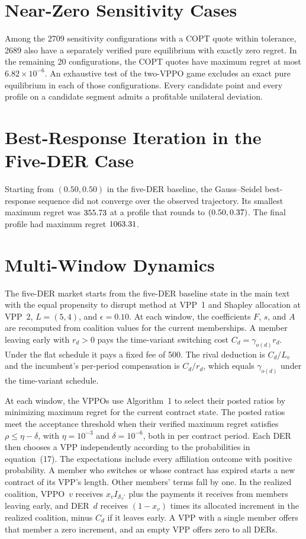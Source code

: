 \documentclass[10pt]{article}
\begin{document}
\section{Near-Zero Sensitivity Cases}\label{sec:nearzero}
Among the 2709 sensitivity configurations with a COPT quote within tolerance, 2689 also have a separately verified pure equilibrium with exactly zero regret. In the remaining 20 configurations, the COPT quotes have maximum regret at most $6.82\times10^{-6}$. An exhaustive test of the two-VPPO game excludes an exact pure equilibrium in each of those configurations. Every candidate point and every profile on a candidate segment admits a profitable unilateral deviation.

\section{Best-Response Iteration in the Five-DER Case}\label{sec:gs}
Starting from $(0.50,0.50)$ in the five-DER baseline, the Gauss--Seidel best-response sequence did not converge over the observed trajectory. Its smallest maximum regret was $355.73$ at a profile that rounds to $(0.50,0.37)$. The final profile had maximum regret $1063.31$.

\section{Multi-Window Dynamics}\label{sec:dynamics}
The five-DER market starts from the five-DER baseline state in the main text with the equal propensity to disrupt method at VPP~1 and Shapley allocation at VPP~2, $L=(5,4)$, and $\epsilon=0.10$. At each window, the coefficients $F$, $s$, and $A$ are recomputed from coalition values for the current memberships. A member leaving early with $r_d>0$ pays the time-variant switching cost $C_d=\gamma_{o(d)}r_d$. Under the flat schedule it pays a fixed fee of \CurrencySymbol{}500. The rival deduction is $C_d/L_v$ and the incumbent's per-period compensation is $C_d/r_d$, which equals $\gamma_{o(d)}$ under the time-variant schedule.

At each window, the VPPOs use Algorithm~1 to select their posted ratios by minimizing maximum regret for the current contract state. The posted ratios meet the acceptance threshold when their verified maximum regret satisfies $\rho\le\eta-\delta$, with $\eta=10^{-3}$ and $\delta=10^{-6}$, both in \CurrencySymbol{} per contract period. Each DER then chooses a VPP independently according to the probabilities in equation~(17). The expectations include every affiliation outcome with positive probability. A member who switches or whose contract has expired starts a new contract of its VPP's length. Other members' terms fall by one. In the realized coalition, VPPO~$v$ receives $x_v I_{\mathcal S_v'}$ plus the payments it receives from members leaving early, and DER~$d$ receives $(1-x_v)$ times its allocated increment in the realized coalition, minus $C_d$ if it leaves early. A VPP with a single member offers that member a zero increment, and an empty VPP offers zero to all DERs.
\end{document}
